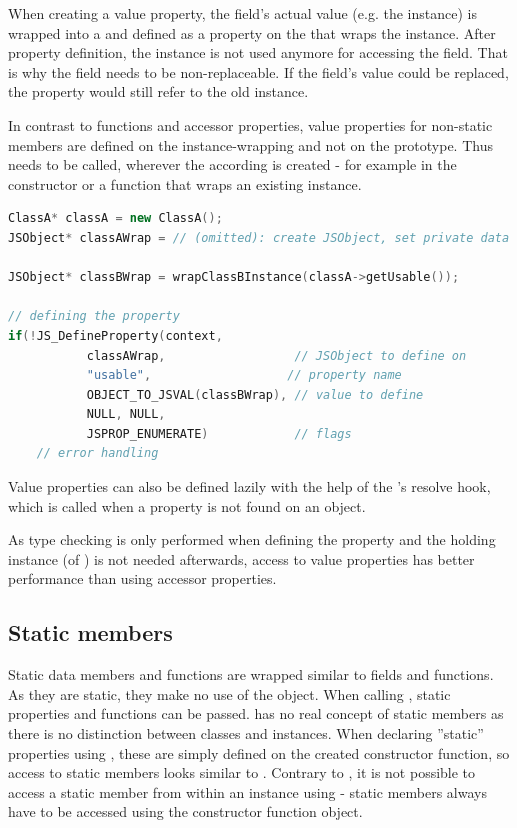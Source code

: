 When creating a value property, the field's actual value (e.g. the  instance) is wrapped into a  and defined as a property on the  that wraps the  instance. After property definition, the  instance is not used anymore for accessing the field. That is why the field needs to be non-replaceable. If the field's value could be replaced, the  property would still refer to the old instance.

In contrast to functions and accessor properties, value properties for non-static members are defined on the instance-wrapping  and not on the prototype. Thus  needs to be called, wherever the according  is created - for example in the constructor or a function that wraps an existing instance.

\SingleSpacing
\begin{lstlisting}[language=C++, caption=Defining a value property]
ClassA* classA = new ClassA();
JSObject* classAWrap = // (omitted): create JSObject, set private data

JSObject* classBWrap = wrapClassBInstance(classA->getUsable());

// defining the property
if(!JS_DefineProperty(context, 
           classAWrap,                  // JSObject to define on
           "usable",                   // property name
           OBJECT_TO_JSVAL(classBWrap), // value to define
           NULL, NULL,
           JSPROP_ENUMERATE)            // flags
	// error handling
\end{lstlisting}
\OnehalfSpacing

Value properties can also be defined lazily with the help of the 's resolve hook, which is called when a property is not found on an object.

As type checking is only performed when defining the property and the holding instance (of ) is not needed afterwards, access to value properties has better performance than using accessor properties.

\subsection{Static members}

Static data members and functions are wrapped similar to fields and functions. As they are static, they make no use of the  object. When calling , static properties and functions can be passed.  has no real concept of static members as there is no distinction between classes and instances. When declaring ''static'' properties using , these are simply defined on the created constructor function, so access to static members looks similar to . Contrary to , it is not possible to access a static member from within an instance using  - static members always have to be accessed using the constructor function object.

